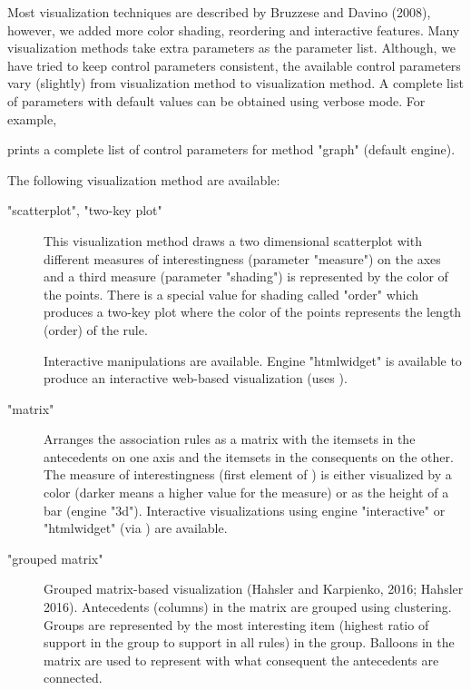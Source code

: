 \documentclass[letterpaper]{book}
\begin{document}
%
\begin{Details}\relax
Most visualization techniques are described by Bruzzese and Davino (2008),
however, we added more color shading, reordering and interactive features.
Many visualization methods take extra parameters as the  parameter list. Although, we have tried to keep control parameters consistent, the available control parameters vary (slightly) from visualization method to visualization method. A complete list of parameters with default
values can be obtained using verbose mode. For example, 


prints a complete list of control parameters for method "graph" 
(default engine).

The following visualization method are available:

\begin{description}

\item["scatterplot", "two-key plot"]  
This visualization method draws a two dimensional scatterplot with different
measures of interestingness (parameter "measure") on the axes and a third 
measure (parameter "shading") is represented by the color of the points. 
There is a special value for shading called "order" which produces a
two-key plot where the color of the points represents the length (order) 
of the rule.

Interactive manipulations are available. 
Engine "htmlwidget" is available to produce an interactive web-based
visualization (uses ).


\item["matrix"]  
Arranges the association rules as a matrix with the itemsets in the antecedents
on one axis and the itemsets in the consequents on the other.  The
measure of interestingness (first element of ) is either visualized by a color (darker means a higher value for the
measure) or as the height of a bar (engine "3d"). Interactive
visualizations using engine "interactive" or "htmlwidget" (via )
are available.


\item["grouped matrix"] 
Grouped matrix-based visualization (Hahsler and Karpienko, 2016; Hahsler 2016). 
Antecedents (columns) in the matrix are
grouped using clustering. Groups are represented by the most
interesting item (highest ratio of support in the group to support in all rules) 
in the group. Balloons
in the matrix are used to represent with what consequent the antecedents are 
connected.


\end{description}
\end{Details}
\end{document}
